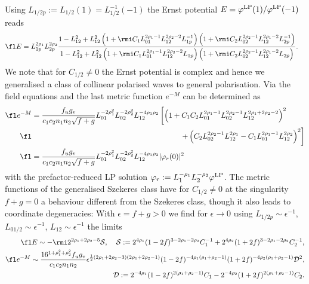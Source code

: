 \documentclass[12pt]{iopart}
\begin{document}
Using $L_{1/2p}:=L_{1/2}(1)=L_{1/2}^{-1}(-1)$ the Ernst potential $E=\varphi^{\rm LP}(1)/\varphi^{\rm LP}(-1)$ reads 
\begin{eqnarray}
\fl E&=L_{1p}^{2\rho_1}L_{2p}^{2\rho_2}\frac{1-L_{12}^2+L_{12}^2\left(1+\rmi C_1 L_{01}^{2 \rho_1-1} L_{12}^{2 \rho_2-2}L_{1p}^{-1}\right) \left(1+\rmi C_2 L_{02}^{2 \rho_2-1} L_{12}^{2\rho_1-2}L_{2p}^{-1}\right)}
{1-L_{12}^2+L_{12}^2\left(1+\rmi C_1 L_{01}^{2 \rho_1-1} L_{12}^{2 \rho_2-2}L_{1p}\right) \left(1+\rmi C_2 L_{02}^{2 \rho_2-1} L_{12}^{2\rho_1-2}L_{2p}\right)}. 
\label{EAllgSzek}
\end{eqnarray}
We note that for $C_{1/2}\neq 0$ the Ernst potential is complex and hence we generalised a class of collinear polarised waves to general polarisation.
Via the field equations  and  the last metric function $e^{-M}$ can be determined as
\begin{eqnarray}
\fl e^{-M}&=\frac{f_u g_v}{c_1 c_2 n_1 n_2 \sqrt{f+g}}  
  L_{01}^{-2\rho_1^2}L_{02}^{-2\rho_2^2}L_{12}^{-4\rho_1\rho_2}
  \left[\left(1+C_1 C_2 L_{01}^{2\rho_1-1}L_{02}^{2\rho_2-1}L_{12}^{2\rho_1+2\rho_2-2}\right)^2\right. \nonumber\\
\fl  &\hspace{7cm}\left.+\left(C_2 L_{02}^{2\rho_2-1}L_{12}^{2\rho_1}-C_1 L_{01}^{2\rho_1-1}L_{12}^{2\rho_2}\right)^2\right] \\
\fl  &=\frac{f_u g_v}{c_1 c_2 n_1 n_2 \sqrt{f+g}}  
  L_{01}^{-2\rho_1^2}L_{02}^{-2\rho_2^2}L_{12}^{-4\rho_1\rho_2}
  |\varphi_r(0)|^2
\label{eHochmMAllgSzek}
\end{eqnarray}
with the prefactor-reduced LP solution $\varphi_r:= L_1^{-\rho_1} L_2^{-\rho_2}\varphi^{\rm LP}$. The metric functions of the generalised Szekeres class have for $C_{1/2}\neq 0$ at the singularity $f+g=0$ a behaviour different from the Szekeres class, though it also leads to coordinate degeneracies: With $\epsilon=f+g>0$ we find for $\epsilon\to 0$ using $L_{1/2p}\sim\epsilon^{-1}$, $L_{01/2}\sim\epsilon^{-1}$, $L_{12}\sim\epsilon^{-1}$ the limits
\begin{eqnarray}
\fl E\sim-\rmi 2^{2\rho_1+2\rho_2-5} \mathcal{S},\;\;\;\; 
 \mathcal{S}:=2^{4\rho_1} (1-2f)^{3-2\rho_1-2\rho_2}C_1^{-1}+2^{4 \rho_2} (1+2f)^{3-2\rho_1-2\rho_2}C_2^{-1}, \\
\fl e^{-M}\sim\frac{16^{1+\rho_1^2+\rho_2^2}f_ug_v}{c_1c_2n_1n_2}\epsilon^{\frac12(2\rho_1+2\rho_2-3)(2\rho_1+2\rho_2-1)}(1-2f)^{-4\rho_1(\rho_1+\rho_2-1)}(1+2f)^{-4\rho_2(\rho_1+\rho_2-1)}\mathcal{D}^2, \nonumber \\
 \mathcal{D}:= 2^{-4\rho_1}(1-2f)^{2(\rho_1+\rho_2-1)}C_1 - 2^{-4\rho_2}(1+2f)^{2(\rho_1+\rho_2-1)}C_2.
\end{eqnarray}
\end{document}
